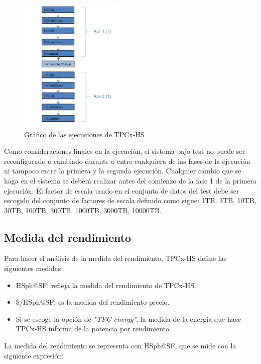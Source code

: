 \documentclass[10pt]{article}
\begin{document}
		\begin{figure}[h]
			\centering
			\includegraphics[width=5cm]{./images/executionsTPC.png}
			\caption{Gráfico de las ejecuciones de TPCx-HS} 
			\label{fig:ejecucionesTPC}
		\end{figure}
		
		Como consideraciones finales en la ejecución, el sistema bajo test no puede ser reconfigurado o cambiado durante o entre cualquiera de las fases de la ejecución ni tampoco entre la primera y la segunda ejecución. Cualquier cambio que se haga en el sistema se deberá realizar antes del comienzo de la fase 1 de la primera ejecución. El factor de escala usado en el conjunto de datos del test debe ser escogido del conjunto de factores de escala definido como sigue: 1TB, 3TB, 10TB, 30TB, 100TB, 300TB, 1000TB, 3000TB, 10000TB.
	
	\subsection{Medida del rendimiento}
	
		Para hacer el análisis de la medida del rendimiento, TPCx-HS define las siguientes medidas:
		
		\begin{itemize}
			\item HSph@SF: refleja la medida del rendimiento de TPCx-HS.
			\item \$/HSph@SF: es la medida del rendimiento-precio.
			\item Si se escoge la opción de \textit{"TPC-energy"}, la medida de la energía que hace TPCx-HS informa de la potencia por rendimiento. \\
		\end{itemize}
		
		La medida del rendimiento se representa con HSph@SF, que se mide con la siguiente expresión:
		
\end{document}
